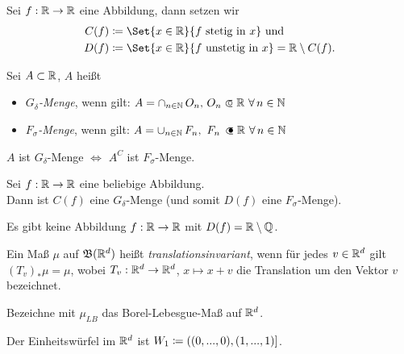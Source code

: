 \documentclass{cheat-sheet}
\newcommand{\Bor}{\mathfrak{B}} %
\theoremstyle{definition}
\begin{document}
\begin{nota}
  Sei $f : \mathbb{R} \to \mathbb{R}$ eine Abbildung, dann setzen wir
  \begin{align*}
    C(f) & \coloneqq \Set{ x \in \R }{ f \text{ stetig in } x } \text{ und}\\
    D(f) & \coloneqq \Set{ x \in \R }{ f \text{ unstetig in } x } = \R \setminus C(f).
  \end{align*}
\end{nota}

\begin{defn}
  Sei $A \subset \mathbb{R}$, $A$ heißt
  \begin{itemize}
    \item \emph{$G_{\delta}$-Menge}, wenn gilt: $A = \cap_{n \in \N}\,O_n, \, O_n \opn \R\ \forall\,n \in \N$
    \item \emph{$F_{\sigma}$-Menge}, wenn gilt: $A = \cup_{n \in \N}\,F_n, \,\, F_n \, \cls \R\ \forall\,n \in \N$
  \end{itemize}
\end{defn}

\begin{bem}
  $A $ ist $G_\delta$-Menge $\iff$ $A^C$ ist $F_\sigma$-Menge.
\end{bem}

\begin{satz}
  Sei $f : \mathbb{R} \to \mathbb{R}$ eine beliebige Abbildung. \\
  Dann ist $C(f)$ eine $G_\delta$-Menge (und somit $D(f)$ eine $F_\sigma$-Menge).
\end{satz}

\begin{kor}
  Es gibt keine Abbildung $f : \mathbb{R} \to \mathbb{R}$ mit $D(f) = \mathbb{R} \setminus \mathbb{Q}$.
\end{kor}


\begin{defn}
  Ein Maß $\mu$ auf $\Bor(\R^d)$ heißt \emph{translationsinvariant}, wenn für jedes $v \in \mathbb{R}^d$ gilt $(T_v)_* \mu = \mu$, wobei $T_v : \mathbb{R}^d \to \mathbb{R}^d$, $x \mapsto x + v$ die Translation um den Vektor $v$ bezeichnet.
\end{defn}

\begin{nota}
  Bezeichne mit $\mu_{LB}$ das Borel-Lebesgue-Maß auf $\mathbb{R}^d$.
\end{nota}

\begin{nota}
  Der Einheitswürfel im $\mathbb{R}^d$ ist $W_1 \coloneqq \left( (0, ..., 0), (1, ..., 1) \right]$.
\end{nota}
\end{document}
